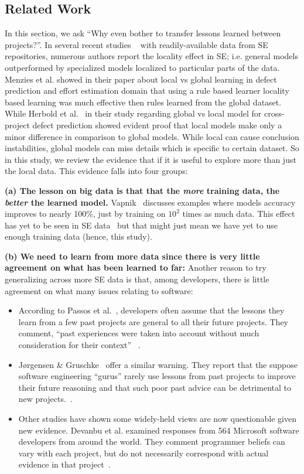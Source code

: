 \documentclass[10pt,journal,compsoc]{IEEEtran}
\newcommand{\bi}{\begin{itemize}}
\newcommand{\ei}{\end{itemize}}
\begin{document}
\subsection{Related Work}
\label{sec:related}

In this section, we ask ``Why even bother to transfer lessons learned between projects?''. In several recent studies ~\cite{bettenburg2012think, menzies2012local, posnett2011ecological} with readily-available data from SE repositories, numerous authors report the locality effect in SE; i.e. general models outperformed by specialized models localized to particular parts of the data. Menzies et al. showed in their paper about local vs global learning in defect prediction and effort estimation domain that using a rule based learner locality based learning was much effective then rules learned from the global dataset. While Herbold et al.~\cite{herbold2017global} in their study regarding global vs local model for cross-project defect prediction showed evident proof that local models make only a minor difference in comparison to global models. While local can cause conclusion instabilities, global models can miss details which is specific to certain dataset. So in this study, we review the evidence that if it is useful to explore more than just the local data. This evidence falls into four groups:

\textbf{(a) The lesson on big data is that that the {\em more} training data, the {\em better} the learned model.} Vapnik~\cite{vapnik14} discusses examples where models accuracy improves to nearly 100\%, just by training on $10^2$ times as much data. This effect has yet to be seen in SE data~\cite{menzies2013guest} but that might just mean we have yet to use enough training data (hence, this study). 

\textbf{(b) We need to learn from more data since there is very little agreement on what has been learned to far:} Another reason to try generalizing across more SE data is that, among developers, there is little agreement on what many issues relating to software:
\bi
    \item
    According to Passos et al.~\cite{passos11},  developers often  assume that the lessons they learn from a few past projects are general to all their future projects. They comment, ``past experiences were taken into account without much consideration for their context'' ~\cite{passos11}. 
	\item
	J{\o}rgensen \& Gruschke~\cite{Jo09} offer a similar warning. They report that the suppose software engineering ``gurus'' rarely use lessons from past projects to improve their future reasoning and that such poor past advice can be detrimental to new projects.~\cite{Jo09}.
    \item 
    Other studies have shown some widely-held views are   now questionable given new evidence. Devanbu et al. examined responses from 564 Microsoft software developers from around
	the world. They comment programmer beliefs can vary with each project, but do not necessarily
	correspond with actual evidence in that project~\cite{De16}. 
\ei
	
\end{document}
